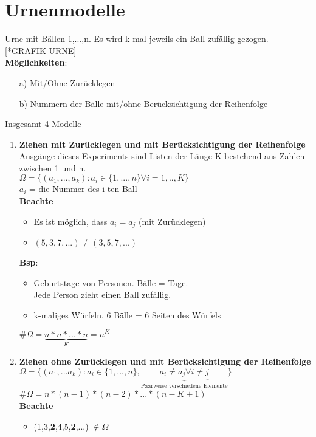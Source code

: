 \section{Urnenmodelle}
Urne mit Bällen 1,...,n. Es wird k mal jeweils ein Ball zufällig gezogen. [*GRAFIK URNE]\\
\textbf{Möglichkeiten}:
\begin{enumerate}
	\item[a)] Mit/Ohne Zurücklegen
	\item[b)] Nummern der Bälle mit/ohne Berücksichtigung der Reihenfolge
\end{enumerate}
Insgesamt 4 Modelle
\begin{enumerate}
	\item \textbf{Ziehen mit Zurücklegen und mit Berücksichtigung der Reihenfolge}\\
	Ausgänge dieses Experiments sind Listen der Länge K bestehend aus Zahlen zwischen 1 und n.\\
	$\Omega=\{(a_1,...,a_k):a_i \in \{1,...,n\} \forall i = 1,..,K\}$\\
	$a_i$ = die Nummer des i-ten Ball\smallskip\\
	\textbf{Beachte}
\begin{itemize}
	\item 	Es ist möglich, dass $a_i = a_j$ (mit Zurücklegen)
	\item 	$(5,3,7,...) \neq (3,5,7,...)$
\end{itemize}
	\textbf{Bsp}:
	\begin{itemize}
		\item Geburtstage von Personen. Bälle = Tage. \\Jede Person zieht einen Ball zufällig.
		\item k-maliges Würfeln. 6 Bälle = 6 Seiten des Würfels\\
	\end{itemize}
$\#\Omega = \underbrace{n * n * ... * n}_K = n^K$
	\item \textbf{Ziehen ohne Zurücklegen und mit Berücksichtigung der Reihenfolge}\\
	$\Omega=\{(a_1,...a_k):a_i \in \{1,...,n\},\underbrace{a_i \neq a_j\forall i\neq j}_\text{Paarweise verschiedene Elemente} \}$\smallskip\\
	\#$\Omega = n* (n-1)*(n-2)*...*(n-K+1)$\smallskip\\
	\textbf{Beachte}
	\begin{itemize}
		\item (1,3,\textbf{2},4,5,\textbf{2},...) $\notin \Omega$

\end{itemize}
\end{enumerate}
